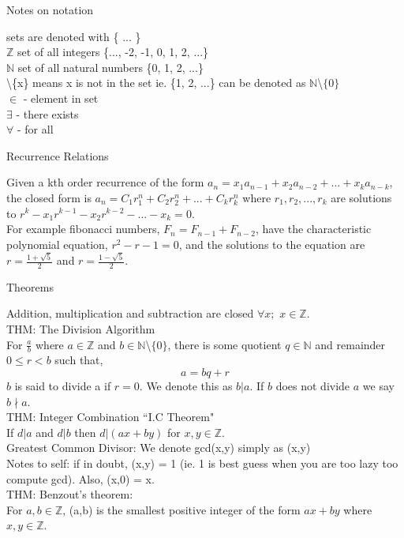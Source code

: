 \documentclass[12pt]{article}
\def \z{\mathbb{Z}}
\def \n{\mathbb{N}}
\def \no{\noindent}
\begin{document}
\begin{center} Notes on notation \end{center}

\no sets are denoted with \{ ... \}\\

\no $\z$ set of all integers \{..., -2, -1, 0, 1, 2, ...\}\\

\no $\n$ set of all natural numbers \{0, 1, 2, ...\}\\

\no \textbackslash \{x\} means x is not in the set ie. \{1, 2, ...\} can be denoted as $\n$\textbackslash$\{0\}$\\

\no $\in$ - element in set\\

\no $\exists$ - there exists\\

\no $\forall$ - for all

\begin{center} Recurrence Relations \end{center}

Given a kth order recurrence of the form $a_n=x_1a_{n-1}+x_2a_{n-2}+...+x_ka_{n-k}$, the closed form is $a_n = C_1r_1^n+C_2r_2^n+...+C_kr_k^n$ where $r_1,r_2,...,r_k$ are solutions to $r^k-x_1r^{k-1}-x_2r^{k-2}-...-x_k=0$.\\

For example fibonacci numbers, $F_n = F_{n-1} + F_{n-2}$, have the characteristic polynomial equation, $r^2 -r -1 = 0$, and the solutions to the equation are $r=\frac{1+\sqrt{5}}2$ and $r=\frac{1-\sqrt{5}}2$.

\begin{center} Theorems \end{center}

\no Addition, multiplication and subtraction are closed $\forall x;$ $x \in \z$.\\

\no THM: The Division Algorithm\\
\hangindent=1cm For $\frac ab$ where $a \in \z$ and $b \in \n$\textbackslash$\{0\}$, there is some quotient $q \in \n$ and remainder $0 \leq r < b$ such that,
\[ a = bq + r\]
$b$ is said to divide a if $r=0$. We denote this as $b|a$. If $b$ does not divide $a$ we say $b \nmid a$.\\

\no THM: Integer Combination ``I.C Theorem"\\
\hangindent=1cm If $d|a$ and $d|b$ then $d|(ax + by)$ for $x,y \in \z$.\\

\no Greatest Common Divisor: We denote gcd(x,y) simply as (x,y)\\
\hangindent=1cm Notes to self: if in doubt, (x,y) = 1 (ie. 1 is best guess when you are too lazy too compute gcd). Also, (x,0) = x.\\

\no THM: Benzout's theorem:\\
\hangindent=1cm For $a,b \in \z$, (a,b) is the smallest positive integer of the form $ax+by$ where $x,y \in \z$.\\
\end{document}
